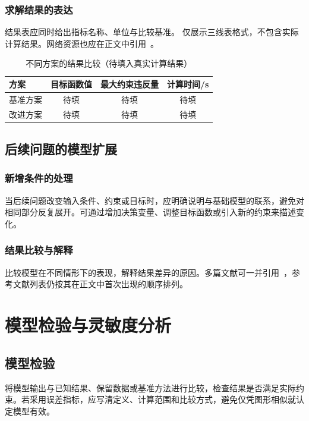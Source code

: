 \documentclass{gmcmthesis}
\begin{document}
\subsubsection{求解结果的表达}
结果表应同时给出指标名称、单位与比较基准。 仅展示三线表格式，不包含实际计算结果。网络资源也应在正文中引用~\cite{demo-online}。

\begin{table}[htbp]
  \centering
  \caption{不同方案的结果比较（待填入真实计算结果）}
  \label{tab:results}
  \begin{tabularx}{0.88\linewidth}{Xccc}
    \toprule
    方案 & 目标函数值 & 最大约束违反量 & 计算时间/s\\
    \midrule
    基准方案 & 待填 & 待填 & 待填\\
    改进方案 & 待填 & 待填 & 待填\\
    \bottomrule
  \end{tabularx}
\end{table}

\subsection{后续问题的模型扩展}

\subsubsection{新增条件的处理}
当后续问题改变输入条件、约束或目标时，应明确说明与基础模型的联系，避免对相同部分反复展开。可通过增加决策变量、调整目标函数或引入新的约束来描述变化。

\subsubsection{结果比较与解释}
比较模型在不同情形下的表现，解释结果差异的原因。多篇文献可一并引用~\cite{demo-book,demo-article}，参考文献列表仍按其在正文中首次出现的顺序排列。

\section{模型检验与灵敏度分析}

\subsection{模型检验}
将模型输出与已知结果、保留数据或基准方法进行比较，检查结果是否满足实际约束。若采用误差指标，应写清定义、计算范围和比较方式，避免仅凭图形相似就认定模型有效。
\end{document}
